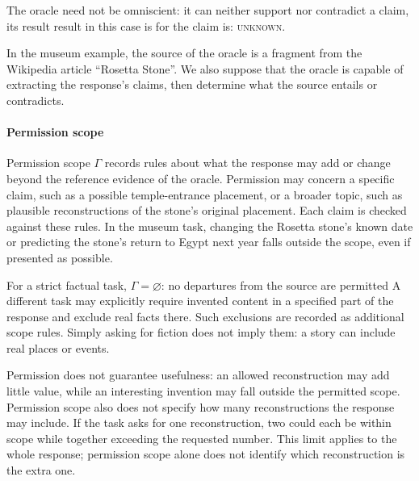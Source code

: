 \documentclass{clv2025}
\begin{document}
The oracle need not be
omniscient: it can neither support nor contradict a claim, its result result in this case is for the claim is:
\textsc{unknown}. 


In the museum example, the source of the oracle is
a fragment from the Wikipedia article ``Rosetta Stone''. We also suppose that the oracle is capable of extracting the response's claims, then determine
what the source entails or contradicts. %

\paragraph{Permission scope}
Permission scope $\Gamma$ records rules about what the response may add or
change beyond the reference evidence of the oracle. Permission may concern a specific
claim, such as a possible temple-entrance placement, or a broader topic, such
as plausible reconstructions of the stone's original placement. Each claim
is checked against these rules. In the museum task, changing the Rosetta stone's
known date or predicting the stone's return to Egypt next year falls outside
the scope, even if presented as possible.

For a strict factual task, $\Gamma=\varnothing$: no departures from the source are permitted%
A different task may explicitly require
invented content in a specified part of the response and exclude real facts
there. Such exclusions are recorded as additional scope rules. Simply asking
for fiction does not imply them: a story can include real places or events.

Permission does not guarantee usefulness: an allowed reconstruction may add
little value, while an interesting invention may fall outside the permitted
scope. Permission scope also does not specify how many reconstructions the
response may include. If the task asks for one reconstruction, two could each
be within scope while together exceeding the requested number. This limit
applies to the whole response; permission scope alone does not identify which
reconstruction is the extra one.
\end{document}

